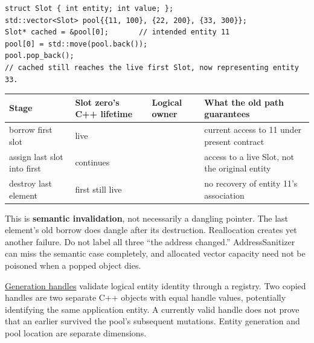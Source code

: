 \begin{verbatim}
struct Slot { int entity; int value; };
std::vector<Slot> pool{{11, 100}, {22, 200}, {33, 300}};
Slot* cached = &pool[0];       // intended entity 11
pool[0] = std::move(pool.back());
pool.pop_back();
// cached still reaches the live first Slot, now representing entity 33.
\end{verbatim}

{\def\LTcaptype{none} %
\begin{longtable}[]{@{}
  >{\raggedright\arraybackslash}p{}
  >{\raggedright\arraybackslash}p{}
  >{\raggedright\arraybackslash}p{}
  >{\raggedright\arraybackslash}p{}@{}}
\toprule\noalign{}
\begin{minipage}[b]{\linewidth}\raggedright
Stage
\end{minipage} & \begin{minipage}[b]{\linewidth}\raggedright
Slot zero's C++ lifetime
\end{minipage} & \begin{minipage}[b]{\linewidth}\raggedright
Logical owner
\end{minipage} & \begin{minipage}[b]{\linewidth}\raggedright
What the old path guarantees
\end{minipage} \\
\midrule\noalign{}
\endhead
\bottomrule\noalign{}
\endlastfoot
borrow first slot & live & 11 & current access to 11 under present contract \\
assign last slot into first & continues & 33 & access to a live Slot, not the original entity \\
destroy last element & first still live & 33 & no recovery of entity 11's association \\
\end{longtable}
}

This is \textbf{semantic invalidation}, not necessarily a dangling pointer. The last element's old borrow does dangle after its destruction. Reallocation creates yet another failure. Do not label all three ``the address changed.'' AddressSanitizer can miss the semantic case completely, and allocated vector capacity need not be poisoned when a popped object dies.

\hyperref[appendix-f1581457d322]{Generation handles} validate logical entity identity through a registry. Two copied handles are two separate C++ objects with equal handle values, potentially identifying the same application entity. A currently valid handle does not prove that an earlier  survived the pool's subsequent mutations. Entity generation and pool location are separate dimensions.

